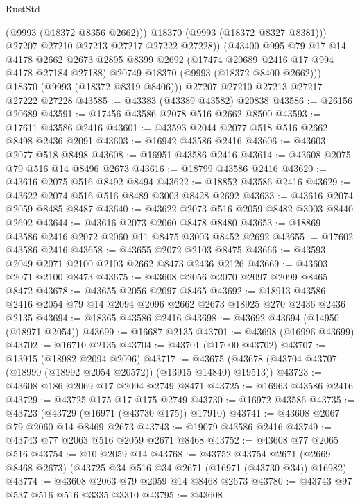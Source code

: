\begin{lexlean}{RustStd}
\begin{coremodule}
              (@9993 (@18372 @8356 @2662)))
            @18370
            (@9993 (@18372 @8327 @8381)))
          @27207
          @27210
          @27213
          @27217
          @27222
          @27228))
      (@43400
        @995
        @79
        @17
        @14
        @4178
        @2662
        @2673
        @2895
        @8399
        @2692
        (@17474 @20689 @2416 @17 @994 @4178 @27184 @27188)
        @20749
        @18370
        (@9993 (@18372 @8400 @2662)))
      @18370
      (@9993 (@18372 @8319 @8406)))
    @27207
    @27210
    @27213
    @27217
    @27222
    @27228
@43585 := @43383 (@43389 @43582) @20838
@43586 := @26156 @20689
@43591 := @17456 @43586 @2078 @516 @2662 @8500
@43593 := @17611 @43586 @2416
@43601 := @43593 @2044 @2077 @518 @516 @2662 @8498 @2436 @2091
@43603 := @16942 @43586 @2416
@43606 := @43603 @2077 @518 @8498
@43608 := @16951 @43586 @2416
@43614 := @43608 @2075 @79 @516 @14 @8496 @2673
@43616 := @18799 @43586 @2416
@43620 := @43616 @2075 @516 @8492 @8494
@43622 := @18852 @43586 @2416
@43629 := @43622 @2074 @516 @516 @8489 @3003 @8428 @2692
@43633 := @43616 @2074 @2059 @8485 @8487
@43640 := @43622 @2073 @516 @2059 @8482 @3003 @8440 @2692
@43644 := @43616 @2073 @2060 @8478 @8480
@43653 := @18869 @43586 @2416 @2072 @2060 @11 @8475 @3003 @8452 @2692
@43655 := @17602 @43586 @2416
@43658 := @43655 @2072 @2103 @8475
@43666 := @43593 @2049 @2071 @2100 @2103 @2662 @8473 @2436 @2126
@43669 := @43603 @2071 @2100 @8473
@43675 := @43608 @2056 @2070 @2097 @2099 @8465 @8472
@43678 := @43655 @2056 @2097 @8465
@43692 := @18913 @43586 @2416 @2054 @79 @14 @2094 @2096 @2662 @2673 @18925 @270 @2436 @2436 @2135
@43694 := @18365 @43586 @2416
@43698 := @43692 @43694 (@14950 (@18971 @2054))
@43699 := @16687 @2135
@43701 := @43698 (@16996 @43699)
@43702 := @16710 @2135
@43704 := @43701 (@17000 @43702)
@43707 := @13915 (@18982 @2094 @2096)
@43717 := @43675 (@43678 (@43704 @43707 (@18990 (@18992 @2054 @20572)) (@13915 @14840) @19513))
@43723 := @43608 @186 @2069 @17 @2094 @2749 @8471
@43725 := @16963 @43586 @2416
@43729 := @43725 @175 @17 @175 @2749
@43730 := @16972 @43586
@43735 := @43723 (@43729 (@16971 (@43730 @175)) @17910)
@43741 := @43608 @2067 @79 @2060 @14 @8469 @2673
@43743 := @19079 @43586 @2416
@43749 := @43743 @77 @2063 @516 @2059 @2671 @8468
@43752 := @43608 @77 @2065 @516
@43754 := @10 @2059 @14
@43768 := @43752
    @43754
    @2671
    (@2669 @8468 @2673)
    (@43725 @34 @516 @34 @2671 (@16971 (@43730 @34)) @16982)
@43774 := @43608 @2063 @79 @2059 @14 @8468 @2673
@43780 := @43743 @97 @537 @516 @516 @3335 @3310
@43795 := @43608

\end{coremodule}
\end{lexlean}
